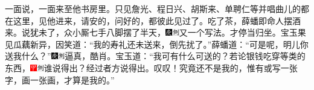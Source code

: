 一面说，一面来至他书房里。只见詹光、程日兴、胡斯来、单聘仁等并唱曲儿的都在这里，见他进来，请安的，问好的，都彼此见过了。吃了茶，薛蟠即命人摆酒来。说犹未了，众小厮七手八脚摆了半天，{\includegraphics[width=3mm]{../Images/00004}\includegraphics[width=3mm]{../Images/00011}\footnotesize \kaishu 又一个写法。}才停当归坐。宝玉果见瓜藕新异，因笑道：``我的寿礼还未送来，倒先扰了。''薛蟠道：``可是呢，明儿你送我什么？''{\includegraphics[width=3mm]{../Images/00004}\includegraphics[width=3mm]{../Images/00011}\footnotesize \kaishu 逼真，酷肖。}宝玉道：``我可有什么可送的？若论银钱吃穿等类的东西，{\includegraphics[width=3mm]{../Images/00002}\includegraphics[width=3mm]{../Images/00011}\footnotesize \kaishu 谁说得出？经过者方说得出。叹叹！}究竟还不是我的，惟有或写一张字，画一张画，才算是我的。''

